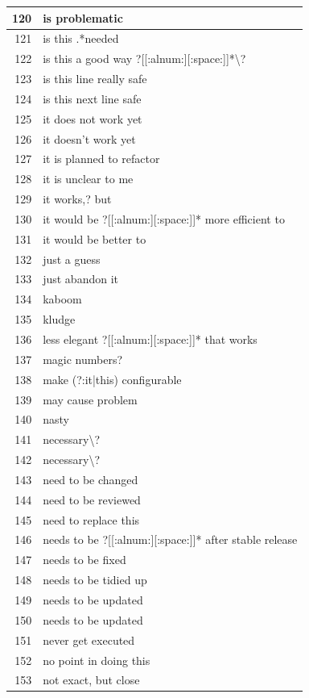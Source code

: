 \documentclass[
]{article}
\begin{document}
\begin{longtable}{r|l}
\hline
120 & is problematic\\
\hline
121 & is this .*needed\\
\hline
122 & is this a good way ?[[:alnum:][:space:]]*\textbackslash{}?\\
\hline
123 & is this line really safe\\
\hline
124 & is this next line safe\\
\hline
125 & it does not work yet\\
\hline
126 & it doesn't work yet\\
\hline
127 & it is planned to refactor\\
\hline
128 & it is unclear to me\\
\hline
129 & it works,? but\\
\hline
130 & it would be ?[[:alnum:][:space:]]* more efficient to\\
\hline
131 & it would be better to\\
\hline
132 & just a guess\\
\hline
133 & just abandon it\\
\hline
134 & kaboom\\
\hline
135 & kludge\\
\hline
136 & less elegant ?[[:alnum:][:space:]]* that works\\
\hline
137 & magic numbers?\\
\hline
138 & make (?:it|this) configurable\\
\hline
139 & may cause problem\\
\hline
140 & nasty\\
\hline
141 & necessary\textbackslash{}?\\
\hline
142 & necessary\textbackslash{}?\\
\hline
143 & need to be changed\\
\hline
144 & need to be reviewed\\
\hline
145 & need to replace this\\
\hline
146 & needs to be ?[[:alnum:][:space:]]* after stable release\\
\hline
147 & needs to be fixed\\
\hline
148 & needs to be tidied up\\
\hline
149 & needs to be updated\\
\hline
150 & needs to be updated\\
\hline
151 & never get executed\\
\hline
152 & no point in doing this\\
\hline
153 & not exact, but close\\

\end{longtable}
\end{document}
